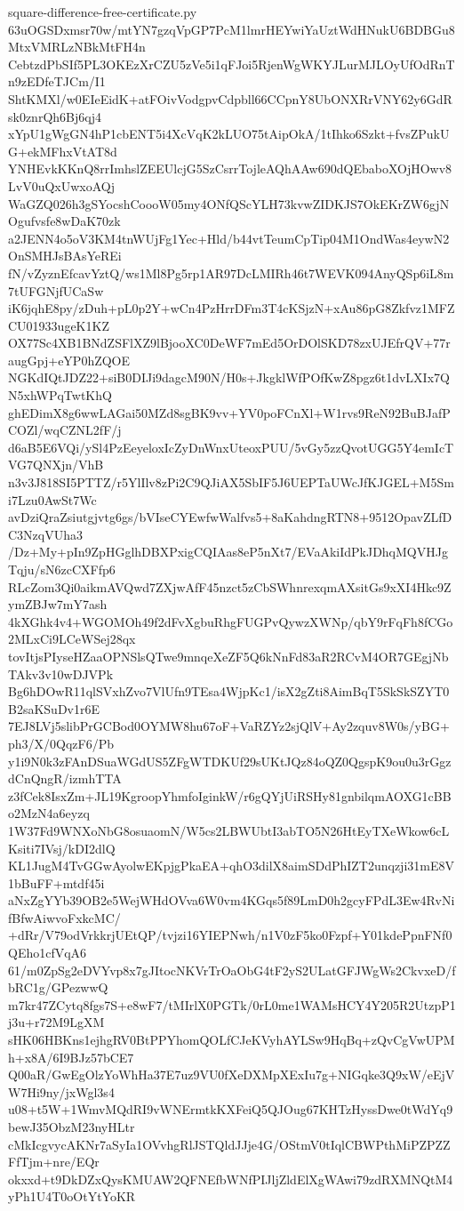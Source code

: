 \documentclass[11pt]{article}
\theoremstyle{definition}
\theoremstyle{remark}
\begin{document}
\begin{filecontents*}[overwrite]{square-difference-free-certificate.py}
63uOGSDxmsr70w/mtYN7gzqVpGP7PcM1lmrHEYwiYaUztWdHNukU6BDBGu8MtxVMRLzNBkMtFH4n
CebtzdPbSIf5PL3OKEzXrCZU5zVe5i1qFJoi5RjenWgWKYJLurMJLOyUfOdRnTn9zEDfeTJCm/I1
ShtKMXl/w0EIeEidK+atFOivVodgpvCdpbll66CCpnY8UbONXRrVNY62y6GdRsk0znrQh6Bj6qj4
xYpU1gWgGN4hP1cbENT5i4XcVqK2kLUO75tAipOkA/1tIhko6Szkt+fvsZPukUG+ekMFhxVtAT8d
YNHEvkKKnQ8rrImhslZEEUlcjG5SzCsrrTojleAQhAAw690dQEbaboXOjHOwv8LvV0uQxUwxoAQj
WaGZQ026h3gSYocshCoooW05my4ONfQScYLH73kvwZIDKJS7OkEKrZW6gjNOgufvsfe8wDaK70zk
a2JENN4o5oV3KM4tnWUjFg1Yec+Hld/b44vtTeumCpTip04M1OndWas4eywN2OnSMHJsBAsYeREi
fN/vZyznEfcavYztQ/ws1Ml8Pg5rp1AR97DcLMIRh46t7WEVK094AnyQSp6iL8m7tUFGNjfUCaSw
iK6jqhE8py/zDuh+pL0p2Y+wCn4PzHrrDFm3T4cKSjzN+xAu86pG8Zkfvz1MFZCU01933ugeK1KZ
OX77Sc4XB1BNdZSFlXZ9lBjooXC0DeWF7mEd5OrDOlSKD78zxUJEfrQV+77raugGpj+eYP0hZQOE
NGKdIQtJDZ22+siB0DIJi9dagcM90N/H0s+JkgklWfPOfKwZ8pgz6t1dvLXIx7QN5xhWPqTwtKhQ
ghEDimX8g6wwLAGai50MZd8sgBK9vv+YV0poFCnXl+W1rvs9ReN92BuBJafPCOZl/wqCZNL2fF/j
d6aB5E6VQi/ySl4PzEeyeloxIcZyDnWnxUteoxPUU/5vGy5zzQvotUGG5Y4emIcTVG7QNXjn/VhB
n3v3J818SI5PTTZ/r5YlIlv8zPi2C9QJiAX5SbIF5J6UEPTaUWcJfKJGEL+M5Smi7Lzu0AwSt7Wc
avDziQraZsiutgjvtg6gs/bVIseCYEwfwWalfvs5+8aKahdngRTN8+9512OpavZLfDC3NzqVUha3
/Dz+My+pIn9ZpHGglhDBXPxigCQIAas8eP5nXt7/EVaAkiIdPkJDhqMQVHJgTqju/sN6zcCXFfp6
RLcZom3Qi0aikmAVQwd7ZXjwAfF45nzct5zCbSWhnrexqmAXsitGs9xXI4Hkc9ZymZBJw7mY7ash
4kXGhk4v4+WGOMOh49f2dFvXgbuRhgFUGPvQywzXWNp/qbY9rFqFh8fCGo2MLxCi9LCeWSej28qx
tovItjsPIyseHZaaOPNSlsQTwe9mnqeXeZF5Q6kNnFd83aR2RCvM4OR7GEgjNbTAkv3v10wDJVPk
Bg6hDOwR11qlSVxhZvo7VlUfn9TEsa4WjpKc1/isX2gZti8AimBqT5SkSkSZYT0B2saKSuDv1r6E
7EJ8LVj5slibPrGCBod0OYMW8hu67oF+VaRZYz2sjQlV+Ay2zquv8W0s/yBG+ph3/X/0QqzF6/Pb
y1i9N0k3zFAnDSuaWGdUS5ZFgWTDKUf29sUKtJQz84oQZ0QgspK9ou0u3rGgzdCnQngR/izmhTTA
z3fCek8IsxZm+JL19KgroopYhmfoIginkW/r6gQYjUiRSHy81gnbilqmAOXG1cBBo2MzN4a6eyzq
1W37Fd9WNXoNbG8osuaomN/W5cs2LBWUbtI3abTO5N26HtEyTXeWkow6cLKsiti7IVsj/kDI2dlQ
KL1JugM4TvGGwAyolwEKpjgPkaEA+qhO3dilX8aimSDdPhIZT2unqzji31mE8V1bBuFF+mtdf45i
aNxZgYYb39OB2e5WejWHdOVva6W0vm4KGqs5f89LmD0h2gcyFPdL3Ew4RvNifBfwAiwvoFxkcMC/
+dRr/V79odVrkkrjUEtQP/tvjzi16YIEPNwh/n1V0zF5ko0Fzpf+Y01kdePpnFNf0QEho1cfVqA6
61/m0ZpSg2eDVYvp8x7gJItocNKVrTrOaObG4tF2yS2ULatGFJWgWs2CkvxeD/fbRC1g/GPezwwQ
m7kr47ZCytq8fgs7S+e8wF7/tMIrlX0PGTk/0rL0me1WAMsHCY4Y205R2UtzpP1j3u+r72M9LgXM
sHK06HBKns1ejhgRV0BtPPYhomQOLfCJeKVyhAYLSw9HqBq+zQvCgVwUPMh+x8A/6I9BJz57bCE7
Q00aR/GwEgOlzYoWhHa37E7uz9VU0fXeDXMpXExIu7g+NIGqke3Q9xW/eEjVW7Hi9ny/jxWgl3s4
u08+t5W+1WmvMQdRI9vWNErmtkKXFeiQ5QJOug67KHTzHyssDwe0tWdYq9bewJ35ObzM23nyHLtr
cMkIcgvycAKNr7aSyIa1OVvhgRlJSTQldJJje4G/OStmV0tIqlCBWPthMiPZPZZFfTjm+nre/EQr
okxxd+t9DkDZxQysKMUAW2QFNEfbWNfPIJljZldElXgWAwi79zdRXMNQtM4yPh1U4T0oOtYtYoKR

\end{filecontents*}
\end{document}
